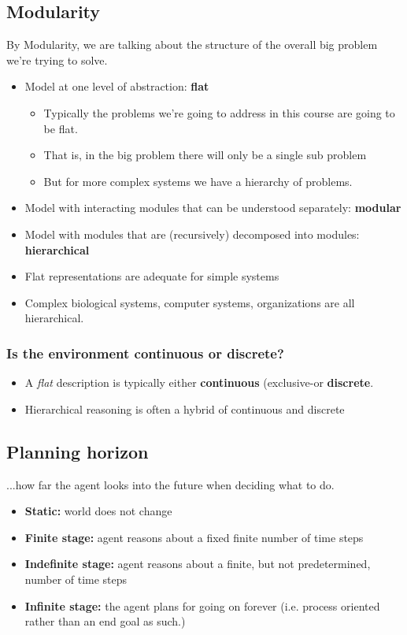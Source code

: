 \documentclass[12pt]{article}
\begin{document}
\newpage
\subsection*{Modularity}

By Modularity, we are talking about the structure of the overall big problem we're trying to solve.

\begin{itemize}
    \item Model at one level of abstraction: \textbf{flat}
    \begin{itemize}
        \item Typically the problems we're going to address in this course are going to be flat.
        \item That is, in the big problem there will only be a single sub problem
        \item But for more complex systems we have a hierarchy of problems.
    \end{itemize}
    \item Model with interacting modules that can be understood separately: \textbf{modular}
    \item Model with modules that are (recursively) decomposed into modules: \textbf{hierarchical}
    \item Flat representations are adequate for simple systems
    \item Complex biological systems, computer systems, organizations are all hierarchical.
\end{itemize}

\subsubsection*{Is the environment continuous or discrete?}
\begin{itemize}
    \item A \emph{flat} description is typically either \textbf{continuous} (exclusive-or \textbf{discrete}.
    \item Hierarchical reasoning is often a hybrid of continuous and discrete
\end{itemize}

\subsection*{Planning horizon}
...how far the agent looks into the future when deciding what to do.

\begin{itemize}
    \item \textbf{Static:} world does not change
    \item \textbf{Finite stage:} agent reasons about a fixed finite number of time steps
    \item \textbf{Indefinite stage:} agent reasons about a finite, but not predetermined, number of time
steps
    \item \textbf{Infinite stage:} the agent plans for going on forever (i.e. process oriented rather than an end goal as such.)
\end{itemize}
\end{document}
